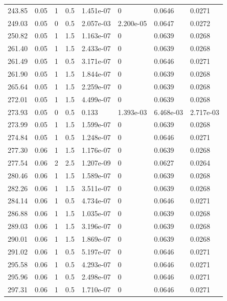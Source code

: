 \documentclass[preview]{standalone}
\begin{document}
{{{\begin{tabular}{L{1.2cm}C{1.2cm} C{0.3cm}C{0.5cm} C{1.4cm}C{1.4cm} C{1.4cm}C{1.4cm}}
  243.85  &  0.05  & 1     & 0.5 &  1.451e-07  & 0  & 0.0646 &  0.0271   \\ 
  249.03  &  0.05  & 0     & 0.5 &  2.057e-03  & 2.200e-05  & 0.0647 &  0.0272   \\ 
  250.82  &  0.05  & 1     & 1.5 &  1.163e-07  & 0  & 0.0639 &  0.0268   \\ 
  261.40  &  0.05  & 1     & 1.5 &  2.433e-07  & 0  & 0.0639 &  0.0268   \\ 
  261.49  &  0.05  & 1     & 0.5 &  3.171e-07  & 0  & 0.0646 &  0.0271   \\ 
  261.90  &  0.05  & 1     & 1.5 &  1.844e-07  & 0  & 0.0639 &  0.0268   \\ 
  265.64  &  0.05  & 1     & 1.5 &  2.259e-07  & 0  & 0.0639 &  0.0268   \\ 
  272.01  &  0.05  & 1     & 1.5 &  4.499e-07  & 0  & 0.0639 &  0.0268   \\ 
  273.93  &  0.05  & 0     & 0.5 &  0.133  & 1.393e-03  & 6.468e-03 &  2.717e-03   \\ 
  273.99  &  0.05  & 1     & 1.5 &  1.599e-07  & 0  & 0.0639 &  0.0268   \\ 
  274.84  &  0.05  & 1     & 0.5 &  1.248e-07  & 0  & 0.0646 &  0.0271   \\ 
  277.30  &  0.06  & 1     & 1.5 &  1.176e-07  & 0  & 0.0639 &  0.0268   \\ 
  277.54  &  0.06  & 2     & 2.5 &  1.207e-09  & 0  & 0.0627 &  0.0264   \\ 
  280.46  &  0.06  & 1     & 1.5 &  1.589e-07  & 0  & 0.0639 &  0.0268   \\ 
  282.26  &  0.06  & 1     & 1.5 &  3.511e-07  & 0  & 0.0639 &  0.0268   \\ 
  284.14  &  0.06  & 1     & 0.5 &  4.734e-07  & 0  & 0.0646 &  0.0271   \\ 
  286.88  &  0.06  & 1     & 1.5 &  1.035e-07  & 0  & 0.0639 &  0.0268   \\ 
  289.03  &  0.06  & 1     & 1.5 &  3.196e-07  & 0  & 0.0639 &  0.0268   \\ 
  290.01  &  0.06  & 1     & 1.5 &  1.869e-07  & 0  & 0.0639 &  0.0268   \\ 
  291.02  &  0.06  & 1     & 0.5 &  5.197e-07  & 0  & 0.0646 &  0.0271   \\ 
  295.58  &  0.06  & 1     & 0.5 &  4.293e-07  & 0  & 0.0646 &  0.0271   \\ 
  295.96  &  0.06  & 1     & 0.5 &  2.498e-07  & 0  & 0.0646 &  0.0271   \\ 
  297.31  &  0.06  & 1     & 0.5 &  1.710e-07  & 0  & 0.0646 &  0.0271   \\ 

\end{tabular}}}}
\end{document}
